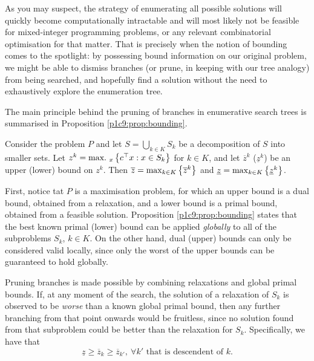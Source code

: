 As you may suspect, the strategy of enumerating all possible solutions will quickly become computationally intractable and will most likely not be feasible for mixed-integer programming problems, or any relevant combinatorial optimisation for that matter. That is precisely when the notion of bounding comes to the spotlight: by possessing bound information on our original problem, we might be able to dismiss branches (or prune, in keeping with our tree analogy) from being searched, and hopefully find a solution without the need to exhaustively explore the enumeration tree.

The main principle behind the pruning of branches in enumerative search trees is summarised in Proposition \ref{p1c9:prop:bounding}.	

\begin{proposition} \label{p1c9:prop:bounding}
	Consider the problem $P$ and let $S = \bigcup_{k \in K} S_k$ be a decomposition of $S$ into smaller sets. Let $z^k = \mathop{\text{max.~}}_x\left\{ c^\top x : x \in S_k \right \}$ for $k \in K$, and let $\overline{z}^k$ ($\underline{z}^k$) be an upper (lower) bound on $z^k$. Then $\overline{z} = \max_{k \in K} \left\{ \overline{z}^k \right \}$ and $\underline{z} = \max_{k \in K} \left\{ \underline{z}^k \right \}$.
\end{proposition}

First, notice tat $P$ is a maximisation problem, for which an upper bound is a dual bound, obtained from a relaxation, and a lower bound is a primal bound, obtained from a feasible solution. Proposition \ref{p1c9:prop:bounding} states that the best known primal (lower) bound can be applied \emph{globally} to all of the subproblems $S_k$, $k \in K$. On the other hand, dual (upper) bounds can only be considered valid locally, since only the worst of the upper bounds can be guaranteed to hold globally.

Pruning branches is made possible by combining relaxations and global primal bounds. If, at any moment of the search, the solution of a relaxation of $S_k$ is observed to be \emph{worse} than a known global primal bound, then any further branching from that point onwards would be fruitless, since no solution found from that subproblem could be better than the relaxation for $S_k$. Specifically, we have that
%
\begin{equation*}
	\underline{z} \ge \overline{z}_k \ge \overline{z}_{k'}, \ \forall k' \text{ that is descendent of } k.	
\end{equation*}



